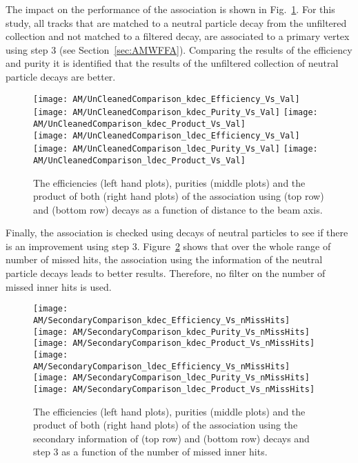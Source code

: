 The impact on the performance of the association is shown in Fig.~\ref{plot:AMWFSVdecEffAndPurRT}. For this study, all tracks that are matched to a neutral particle decay from the unfiltered collection and not matched to a filtered decay, are associated to a primary vertex using step 3 (see Section~\ref{sec:AMWFFA}). Comparing the results of the efficiency and purity it is identified that the results of the unfiltered collection of neutral particle decays are better.

\begin{figure}[t]
    \centering
    \texttt{[image: AM/UnCleanedComparison\_kdec\_Efficiency\_Vs\_Val]}
    \texttt{[image: AM/UnCleanedComparison\_kdec\_Purity\_Vs\_Val]}
    \texttt{[image: AM/UnCleanedComparison\_kdec\_Product\_Vs\_Val]}
    \\
    \texttt{[image: AM/UnCleanedComparison\_ldec\_Efficiency\_Vs\_Val]}
    \texttt{[image: AM/UnCleanedComparison\_ldec\_Purity\_Vs\_Val]}
    \texttt{[image: AM/UnCleanedComparison\_ldec\_Product\_Vs\_Val]}
    \caption[Efficiencies, purities and their product of the association using different \PKzS{} and \PgL{} decay collections as a function of distance to the beam axis]{The efficiencies (left hand plots), purities (middle plots) and the product of both (right hand plots) of the association using \PKzS{} (top row) and \PgL{} (bottom row) decays as a function of distance to the beam axis. \label{plot:AMWFSVdecEffAndPurRT}}
\end{figure}

Finally, the association is checked using decays of neutral particles to see if there is an improvement using step 3. Figure~\ref{plot:AMWFSVdecEffAndPurVsFA} shows that over the whole range of number of missed hits, the association using the information of the neutral particle decays leads to better results. Therefore, no filter on the number of missed inner hits is used.

\begin{figure}[t]
    \centering
    \texttt{[image: AM/SecondaryComparison\_kdec\_Efficiency\_Vs\_nMissHits]}
    \texttt{[image: AM/SecondaryComparison\_kdec\_Purity\_Vs\_nMissHits]}
    \texttt{[image: AM/SecondaryComparison\_kdec\_Product\_Vs\_nMissHits]}
    \\
    \texttt{[image: AM/SecondaryComparison\_ldec\_Efficiency\_Vs\_nMissHits]}
    \texttt{[image: AM/SecondaryComparison\_ldec\_Purity\_Vs\_nMissHits]}
    \texttt{[image: AM/SecondaryComparison\_ldec\_Product\_Vs\_nMissHits]}
    \caption[Efficiencies, purities and their product of the association using \PKzS{} and \PgL{} decays \vs{} step 3 as a function of missed inner hits]{The efficiencies (left hand plots), purities (middle plots) and the product of both (right hand plots) of the association using the secondary information of \PKzS{} (top row) and \PgL{} (bottom row) decays and step 3 as a function of the number of missed inner hits.\label{plot:AMWFSVdecEffAndPurVsFA}}
\end{figure}

